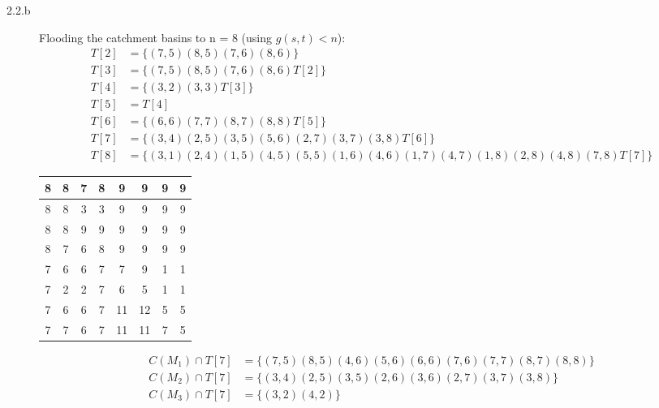 \documentclass[fleqn]{article}
\begin{document}
\begin{description}
\item [2.2.b]
    Flooding the catchment basins to n = 8 (using \begin{math}g(s,t) <
    n\end{math}):
    \begin{align*}
        T[2] &= \{ (7,5) (8,5) (7,6) (8,6) \} \\
        T[3] &= \{ (7,5) (8,5) (7,6) (8,6) T[2] \} \\
        T[4] &= \{ (3,2) (3,3) T[3] \} \\
        T[5] &= T[4] \\
        T[6] &= \{ (6,6) (7,7) (8,7) (8,8) T[5] \} \\
        T[7] &= \{ (3,4) (2,5) (3,5) (5,6) (2,7) (3,7) (3,8) T[6] \} \\
        T[8] &= \{ (3,1) (2,4) (1,5) (4,5) (5,5) (1,6) (4,6) (1,7) (4,7) (1,8) (2,8) (4,8) (7,8) T[7] \}
    \end{align*}

    \begin{tabular}{| c | c | c | c | c | c | c | c |}
        \hline
        8 & 8 & \cellcolor{green} 7 & 8 & 9 & 9 & 9 & 9 \\ \hline
        8 & 8 & \cellcolor{green} 3 & \cellcolor{green} 3 & 9 & 9 & 9 & 9 \\ \hline
        8 & 8 & 9 & 9 & 9 & 9 & 9 & 9 \\ \hline
        8 & \cellcolor{green} 7 & \cellcolor{green} 6 & 8 & 9 & 9 & 9 & 9 \\ \hline
        \cellcolor{green} 7 & \cellcolor{green} 6 & \cellcolor{green} 6 & \cellcolor{green} 7 & \cellcolor{green} 7 & 9 & \cellcolor{green} 1 & \cellcolor{green} 1 \\ \hline
        \cellcolor{green} 7 & \cellcolor{green} 2 & \cellcolor{green} 2 & \cellcolor{green} 7 & \cellcolor{green} 6 & \cellcolor{green} 5 & \cellcolor{green} 1 & \cellcolor{green} 1 \\ \hline
        \cellcolor{green} 7 & \cellcolor{green} 6 & \cellcolor{green} 6 & \cellcolor{green} 7 & 11 & 12 & \cellcolor{green} 5 & \cellcolor{green} 5 \\ \hline
        \cellcolor{green} 7 & \cellcolor{green} 7 & \cellcolor{green} 6 & \cellcolor{green} 7 & 11 & 11 & \cellcolor{green} 7 & \cellcolor{green} 5 \\
        \hline
    \end{tabular}

    \begin{align*}
        C \left (M_1 \right ) \cap T[7] &= \{ (7,5) (8,5) (4,6) (5,6) (6,6) (7,6) (7,7) (8,7) (8,8) \} \\
        C \left (M_2 \right ) \cap T[7] &= \{ (3,4) (2,5) (3,5) (2,6) (3,6) (2,7) (3,7) (3,8) \} \\
        C \left (M_3 \right ) \cap T[7] &= \{ (3,2) (4,2) \}
    \end{align*}


\end{description}
\end{document}
